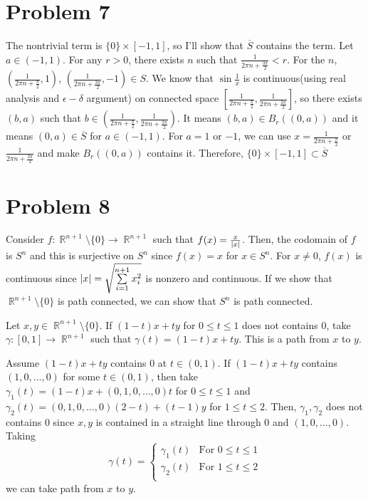 \documentclass{article}
\DeclareMathOperator{\rr}{\mathbb{R}}
\DeclarePairedDelimiter\abs{\lvert}{\rvert}%
\begin{document}
\section*{Problem 7}
The nontrivial term is $\{0\}\times [-1, 1]$, so I'll show that $\overline{S}$ contains the term. Let $a\in (-1, 1)$. For any $r>0$, there exists $n$ such that $ \frac{1}{2\pi n + \frac{3\pi}{2}}<r$. For the $n$, $\left(\frac{1}{2\pi n + \frac{\pi}{2}}, 1\right)$, $\left(\frac{1}{2\pi n + \frac{3\pi}{2}}, -1\right)\in S$. We know that $\sin{\frac{1}{x}}$ is continuous(using real analysis and $\epsilon-\delta$ argument) on connected space $\left[\frac{1}{2\pi n + \frac{\pi}{2}},\frac{1}{2\pi n + \frac{3\pi}{2}}\right]$, so there exists $(b,a)$ such that $b\in \left(\frac{1}{2\pi n + \frac{\pi}{2}},\frac{1}{2\pi n + \frac{3\pi}{2}}\right)$. It means $(b,a)\in B_r((0, a))$ and it means $(0, a)\in \overline{S}$ for $a\in (-1, 1)$. For $a=1$ or $-1$, we can use $x=\frac{1}{2\pi n + \frac{\pi}{2}}$ or $\frac{1}{2\pi n + \frac{3\pi}{2}}$ and make $B_r((0, a))$ contains it. Therefore, $\{0\}\times[-1,1]\subset \overline{S}$
\section*{Problem 8}
Consider $f:\rr^{n+1}\setminus\{0\}\rightarrow\rr^{n+1}$ such that $f(x)=\frac{x}{\abs{x}}$. Then, the codomain of $f$ is $S^n$ and this is surjective on $S^n$ since $f(x)=x$ for $x\in S^n$. For $x\neq 0$, $f(x)$ is continuous since $\abs{x}=\sqrt{\sum\limits_{i=1}^{n+1} x_i^2}$ is nonzero and continuous. If we show that $\rr^{n+1}\setminus\{0\}$ is path connected, we can show that $S^n$ is path connected.

Let $x,y\in \rr^{n+1}\setminus\{0\}$. If $(1-t)x+ty$ for $0\leq t\leq 1$ does not contains $0$, take $\gamma:[0,1]\rightarrow \rr^{n+1}$ such that $\gamma(t)=(1-t)x+ty$. This is a path from $x$ to $y$.

Assume $(1-t)x+ty$ contains $0$ at $t\in (0,1)$. If $(1-t)x+ty$ contains $(1, 0, \ldots, 0)$ for some $t\in (0,1)$, then take $\gamma_1(t)=(1-t)x+(0, 1, 0, \ldots, 0)t$ for $0\leq t \leq 1$ and $\gamma_2(t)=(0, 1, 0, \ldots, 0)(2-t)+(t-1)y$ for $1\leq t \leq 2$. Then, $\gamma_1,\gamma_2$ does not contains $0$ since $x,y$ is contained in a straight line through $0$ and $(1,0, \ldots, 0)$. Taking \begin{equation*}
\gamma(t)=\begin{cases}
\gamma_1(t) & \text{For }0\leq t\leq 1 \\
\gamma_2(t) & \text{For }1\leq t\leq 2 \\
\end{cases}
\end{equation*}
we can take path from $x$ to $y$.
\end{document}

